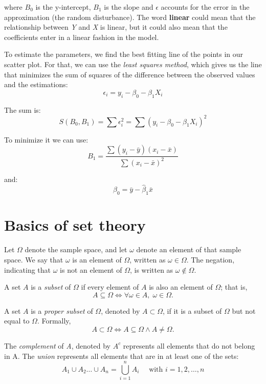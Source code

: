 \documentclass[12pt]{book}
\theoremstyle{definition}
\begin{document}
where $B_0$ is the y-intercept, $B_1$ is the slope and $\epsilon$ accounts for the error in the approximation (the random disturbance). The word \textbf{linear} could mean that the relationship between \textit{Y} and \textit{X} is linear, but it could also mean that the coefficients enter in a linear fashion in the model.

To estimate the parameters, we find the best fitting line of the points in our scatter plot. For that, we can use the \textit{least squares method}, which gives us the line that minimizes the sum of squares of the difference between the observed values and the estimations:
\begin{equation}
    \epsilon_i = y_i - \beta_0 - \beta_1X_i
\end{equation}

The sum is:
\begin{equation}
    S(B_0, B_1) = \sum \epsilon_i^2 = \sum (y_i - \beta_0 - \beta_1 X_i)^2
\end{equation}

To minimize it we can use:
\begin{equation}
    B_1 = \frac{\sum (y_i - \bar{y})(x_i - \bar{x})}{\sum (x_i - \bar{x})^2}
\end{equation}

and:
\begin{equation}
    \beta_0 = \bar{y} - \hat{\beta}_1\bar{x}
\end{equation}

\section{Basics of set theory}
Let $\Omega$ denote the sample space, and let $\omega$ denote an element of that sample space. We say that $\omega$ is an element of $\Omega$, written as $\omega \in \Omega$. The negation, indicating that $\omega$ is not an element of $\Omega$, is written as $\omega \notin \Omega$.

A set $A$ is a \textit{subset} of $\Omega$ if every element of $A$ is also an element of $\Omega$; that is,
\[
A \subseteq \Omega \iff \forall \omega \in A,\; \omega \in \Omega.
\]

A set $A$ is a \textit{proper subset} of $\Omega$, denoted by $A \subset \Omega$, if it is a subset of $\Omega$ but not equal to $\Omega$. Formally,
\[
A \subset \Omega \iff A \subseteq \Omega \land A \neq \Omega.
\]

The \textit{complement} of \textit{A}, denoted by $\textit{A}^c$ represents all elements that do not belong in A. The \textit{union} represents all elements that are in at least one of the sets: 
\[
    A_1 \cup A_2 \dots \cup A_n = \bigcup_{i = 1}^{n} A_i \quad \text{ with } i = 1, 2, \dots, n
\]
\end{document}
